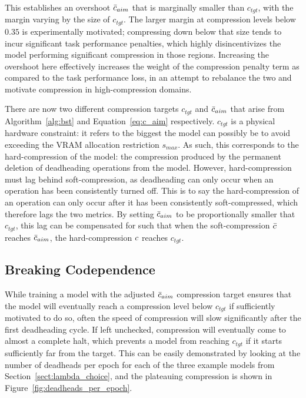 \noindent This establishes an overshoot $\bar{c}_{aim}$ that is marginally smaller than $c_{tgt}$, with the margin varying by
the size of $c_{tgt}$. The larger margin at compression levels below $0.35$ is experimentally motivated; compressing down
below that size tends to incur significant task performance penalties, which highly disincentivizes the model performing
significant compression in those regions. Increasing the overshoot here effectively increases the weight of the compression
penalty term as compared to the task performance loss, in an attempt to rebalance the two and motivate compression in
high-compression domains.

There are now two different compression targets $c_{tgt}$ and $\bar{c}_{aim}$ that arise from Algorithm~\ref{alg:bst} and Equation~\ref{eq:c_aim}
respectively. $c_{tgt}$ is a physical hardware constraint: it refers to the biggest the model can possibly be to avoid
exceeding the VRAM allocation restriction $s_{max}$. As such, this corresponds to the hard-compression of the model: the
compression produced by the permanent deletion of deadheading operations from the model. However, hard-compression
must lag behind soft-compression, as deadheading can only occur when an operation has been consistently turned off. This
is to say the hard-compression of an operation can only occur after it has been consistently soft-compressed, which therefore
lags the two metrics. By setting $\bar{c}_{aim}$ to be proportionally smaller that $c_{tgt}$, this lag can be compensated for
such that when the soft-compression $\bar{c}$ reaches $\bar{c}_{aim}$, the hard-compression $c$ reaches $c_{tgt}$.

\subsection{Breaking Codependence} \label{sect:breaking codependence}
While training a model with the adjusted $\bar{c}_{aim}$ compression target ensures that the model will eventually reach a
compression level below $c_{tgt}$ if sufficiently motivated to do so, often the speed of compression will slow significantly
after the first deadheading cycle. If left unchecked, compression will eventually come to almost a complete halt, which
prevents a model from reaching $c_{tgt}$ if it starts sufficiently far from the target. This can be easily demonstrated
by looking at the number of deadheads per epoch for each of the three example models from Section~\ref{sect:lambda_choice},
and the plateauing compression is shown in Figure~\ref{fig:deadheads_per_epoch}.

